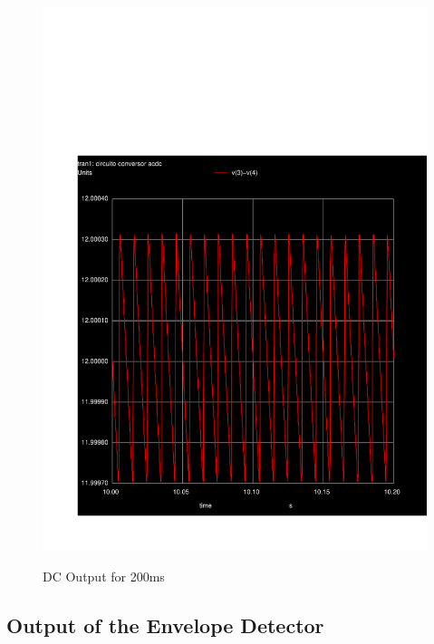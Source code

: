 \begin{figure}[ht] \centering
\caption{DC Output for 200ms}
\includegraphics[width=0.8\linewidth]{../sim/acdc.pdf}
\label{fig:acdc}
\end{figure}

\newpage

\subsection{Output of the Envelope Detector}

